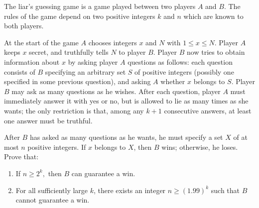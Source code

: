 The liar's guessing game is a game played between two players $A$ and $B$.
The rules of the game depend on two positive integers $k$ and $n$ which are known to both players.

At the start of the game $A$ chooses integers $x$ and $N$ with $1 \le x \le N.$
Player $A$ keeps $x$ secret, and truthfully tells $N$ to player $B$.
Player $B$ now tries to obtain information about $x$ by asking player $A$ questions as follows:
each question consists of $B$ specifying an arbitrary set $S$ of positive integers (possibly one specified in some previous question), and asking $A$ whether $x$ belongs to $S$.
Player $B$ may ask as many questions as he wishes.
After each question, player $A$ must immediately answer it with yes or no, but is allowed to lie as many times as she wants;
the only restriction is that, among any $k+1$ consecutive answers, at least one answer must be truthful.

After $B$ has asked as many questions as he wants, he must specify a set $X$ of at most $n$ positive integers.
If $x$ belongs to $X$,  then $B$ wins; otherwise, he loses.
Prove that:

\begin{enumerate}[label = (\alph*)]
	\item If $n \ge 2^k,$ then $B$ can guarantee a win.

	\item For all sufficiently large $k$,  there exists an integer $n \ge (1.99)^k$ such that $B$ cannot guarantee a win.
\end{enumerate}
